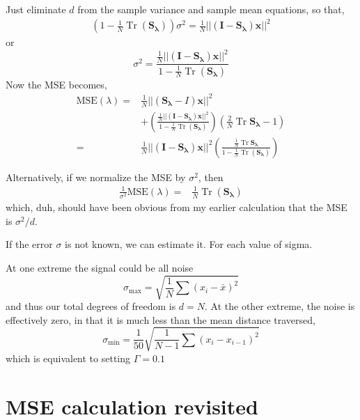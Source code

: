 \documentclass[11pt]{article}
\DeclareMathOperator{\Tr}{Tr}
\begin{document}
Just eliminate $d$ from the sample variance and sample mean equations, so that,
\begin{align}
    \left( 1 - \frac{1}{N} \Tr \left( \mathbf{S_\lambda} \right) \right) \sigma^2 =  \frac{1}{N} || \left( \mathbf{I} - \mathbf{S_\lambda} \right) \mathbf{x} ||^2
\end{align}
or
\begin{equation}
    \sigma^2 = \frac{ \frac{1}{N}|| \left( \mathbf{I} - \mathbf{S_\lambda} \right) \mathbf{x} ||^2}{1-\frac{1}{N}\Tr \left( \mathbf{S_\lambda} \right)}
\end{equation}
Now the MSE becomes,
\begin{align}
\nonumber
    \textrm{MSE}(\lambda) =& \frac{1}{N} || \left( \mathbf{S_\lambda} - I \right) \mathbf{x} ||^2 \\
    & + \left( \frac{\frac{1}{N}|| \left( \mathbf{I} - \mathbf{S_\lambda} \right) \mathbf{x} ||^2}{1-\frac{1}{N}\Tr \left( \mathbf{S_\lambda} \right)} \right) \left( \frac{2}{N} \Tr \mathbf{S_\lambda} -1 \right) \\
    =& \frac{1}{N}|| \left( \mathbf{I} - \mathbf{S_\lambda} \right) \mathbf{x} ||^2 \left( \frac{ \frac{1}{N} \Tr \mathbf{S_\lambda}}{1-\frac{1}{N}\Tr \left( \mathbf{S_\lambda} \right)} \right)
\end{align}

Alternatively, if we normalize the MSE by $\sigma^2$, then
\begin{align}
   \frac{1}{\sigma^2} \textrm{MSE}(\lambda) =& \frac{1}{N}\Tr \left( \mathbf{S_\lambda} \right)
\end{align}
which, duh, should have been obvious from my earlier calculation that the MSE is $\sigma^2/d$.

If the error $\sigma$ is not known, we can estimate it. For each value of sigma.

At one extreme the signal could be all noise
\begin{equation}
    \sigma_{\textrm{max}} = \sqrt{\frac{1}{N} \sum (x_i-\bar{x})^2}
\end{equation}
and thus our total degrees of freedom is $d=N$. At the other extreme, the noise is effectively zero, in that it is much less than the mean distance traversed,
\begin{equation}
    \sigma_{\textrm{min}} = \frac{1}{50} \sqrt{\frac{1}{N-1} \sum (x_i-x_{i-1})^2}
\end{equation}
which is equivalent to setting $\Gamma = 0.1$

%
\section{MSE calculation revisited} \label{sec:mse_revisisted}
%
\end{document}
